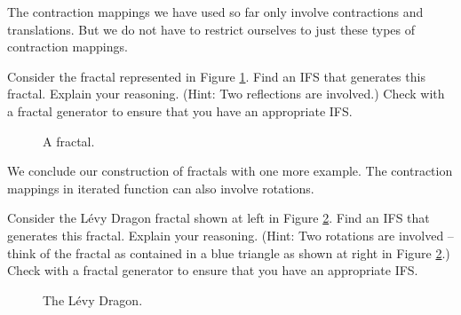 The contraction mappings we have used so far only involve contractions and translations. But we do not have to restrict ourselves to just these types of contraction mappings. 

\begin{pactivity} \label{act:Fractal_reflection} Consider the fractal represented in Figure \ref{F:Fractal_reflection}. Find an IFS that generates this fractal. Explain your reasoning. (Hint: Two reflections are involved.) Check with a fractal generator to ensure that you have an appropriate IFS. 
\begin{figure}[h]
\begin{center}
\caption{A fractal.}
\label{F:Fractal_reflection}
\end{center}
\end{figure}

\end{pactivity}

We conclude our construction of fractals with one more example. The contraction mappings in iterated function can also involve rotations. 

\begin{pactivity} \label{act:Fractal_dragon} Consider the L\'{e}vy Dragon fractal shown at left in Figure \ref{F:Fractal_rotation}. Find an IFS that generates this fractal. Explain your reasoning. (Hint: Two rotations are involved -- think of the fractal as contained in a blue triangle as shown at right in Figure \ref{F:Fractal_rotation}.) Check with a fractal generator to ensure that you have an appropriate IFS. 
\begin{figure}[h]
\begin{center}
 \hspace{0.1in} 
\caption{The L\'{e}vy Dragon.}
\label{F:Fractal_rotation}
\end{center}
\end{figure}

\end{pactivity}


